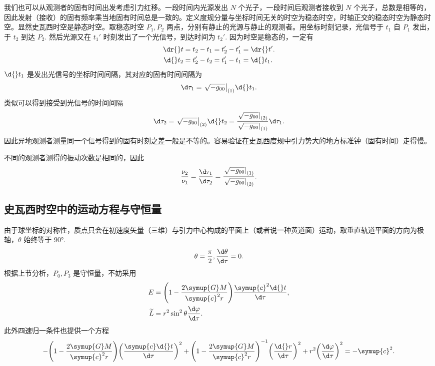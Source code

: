 \documentclass[UTF8, 12pt, a4paper, oneside, onecolumn, fontset=none]{ctexart}
\begin{document}
我们也可以从观测者的固有时间出发考虑引力红移。一段时间内光源发出 $N$ 个光子，一段时间后观测者接收到 $N$ 个光子，总数是相等的，因此发射（接收）的固有频率乘当地固有时间总是一致的。定义度规分量与坐标时间无关的时空为稳态时空，时轴正交的稳态时空为静态时空。显然史瓦西时空是静态时空。取稳态时空 $P_{1}, P_{2}$ 两点，分别有静止的光源与静止的观测者。用坐标时刻记录，光信号于 $t_{1}$ 自 $P_{1}$ 发出，于 $t_{2}$ 到达 $P_{2}$. 然后光源又在 $t_{1}'$ 时刻发出了一个光信号，到达时间为 $t_{2}'$. 因为时空是稳态的，一定有
\begin{align}
\dr{}t&=t_{2}-t_{1}=t_{2}'-t_{1}'=\dr{}t'.\\
\d{}t_{2}&=t_{2}'-t_{2}=t_{1}'-t_{1}=\d{}t_{1}.
\end{align}
$\d{}t_{1}$ 是发出光信号的坐标时间间隔，其对应的固有时间间隔为
\begin{equation}
\d\tau_{1}=\mleft.\sqrt{-g_{00}}\mright\vert_{\mleft(1\mright)}\d{}t_{1}.
\end{equation}
类似可以得到接受到光信号的时间间隔
\begin{equation}
\d\tau_{2}=\mleft.\sqrt{-g_{00}}\mright\vert_{\mleft(2\mright)}\d{}t_{2}=\frac{\mleft.\sqrt{-g_{00}}\mright\vert_{\mleft(2\mright)}}{\mleft.\sqrt{-g_{00}}\mright\vert_{\mleft(1\mright)}}\d\tau_{1}.
\end{equation}
因此异地观测者测量同一个信号得到的固有时刻之差一般是不等的。容易验证在史瓦西度规中引力势大的地方标准钟（固有时间）走得慢。

不同的观测者测得的振动次数是相同的，因此
\begin{equation}
\frac{\nu_{2}}{\nu_{1}}=\frac{\d\tau_{1}}{\d\tau_{2}}=\frac{\mleft.\sqrt{-g_{00}}\mright\vert_{\mleft(1\mright)}}{\mleft.\sqrt{-g_{00}}\mright\vert_{\mleft(2\mright)}}.
\end{equation}

\subsection{史瓦西时空中的运动方程与守恒量}
由于球坐标的对称性，质点只会在初速度矢量（三维）与引力中心构成的平面上（或者说一种黄道面）运动，取垂直轨道平面的方向为极轴，$\theta$ 始终等于 $\ang{90;;}$.
\begin{equation}
\theta=\frac{\pi}{2},\frac{\d\theta}{\d\tau}=0.
\end{equation}
根据上节分析，$P_{0}, P_{3}$ 是守恒量，不妨采用
\begin{align}
E&=\mleft(1-\frac{2\symup{G}M}{\symup{c}^{2}r}\mright)\frac{\symup{c}^{2}\d{}t}{\d\tau},\\
\widetilde{L}&=r^{2}\sin^{2}{\theta}\frac{\d\varphi}{\d\tau}.
\end{align}
此外四速归一条件也提供一个方程
\begin{equation}
-\mleft(1-\frac{2\symup{G}M}{\symup{c}^{2}r}\mright)\mleft(\frac{\symup{c}\d{}t}{\d\tau}\mright)^{2}+\mleft(1-\frac{2\symup{G}M}{\symup{c}^{2}r}\mright)^{-1}\mleft(\frac{\d{}r}{\d\tau}\mright)^{2}+r^{2}\mleft(\frac{\d\varphi}{\d\tau}\mright)^{2}=-\symup{c}^{2}.\label{4.4.4}
\end{equation}
\end{document}
